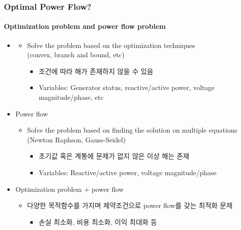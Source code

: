 \documentclass[
	11pt, %
	aspectratio=169, %
]{beamer}
\begin{document}
\begin{frame}
	\frametitle{Optimal Power Flow?}
	\framesubtitle{Optimization problem and power flow problem} %
	
	\begin{itemize}
		\item \color{blue}{Optimization problem}
		\begin{itemize}
			\item Solve the problem based on the optimization techniques\\ 
			(convex, branch and bound, etc)
				\begin{itemize}
				\item 조건에 따라 해가 존재하지 않을 수 있음
				\item Variables: Generator status, reactive/active power, voltage magnitude/phase, etc
			\end{itemize}
		\end{itemize}
	\end{itemize}

	\begin{itemize}
		\item \alert{Power flow}
		\begin{itemize}
			\item Solve the problem based on finding the solution on multiple equations \\
			(Newton Raphson, Gauss-Seidel)
				\begin{itemize}
				\item 초기값 혹은 계통에 문제가 없지 않은 이상 해는 존재
				\item Variables: Reactive/active power, voltage magnitude/phase
			\end{itemize}
		\end{itemize}
	\end{itemize}

		\begin{itemize}
		\item Optimization problem + power flow
		\begin{itemize}
			\item 다양한 목적함수를 가지며 제약조건으로 power flow를 갖는 최적화 문제
				\begin{itemize}
				\item 손실 최소화, 비용 최소화, 이익 최대화 등
			\end{itemize}
		\end{itemize}
	\end{itemize}
	
\end{frame}
\end{document}
